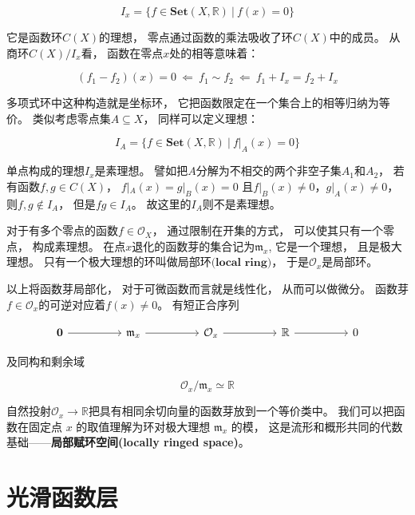 \documentclass[10pt, openany]{book}
\begin{document}
$$
I_x = \{ f \in \textbf{Set}(X,\mathbb R) \ | \ f(x) = 0 \}
$$

它是函数环$C(X)$的理想，
零点通过函数的乘法吸收了环$C(X)$中的成员。
从商环$C(X)/I_x$看，
函数在零点$x$处的相等意味着：

$$
(f_1 - f_2)(x) = 0 \ \Longleftarrow \ f_1 \sim f_2  \ \Longleftarrow \ f_1 + I_x = f_2 + I_x
$$

多项式环中这种构造就是坐标环，
它把函数限定在一个集合上的相等归纳为等价。
类似考虑零点集$A \subseteq X$，
同样可以定义理想：

$$
I_A = \{ f \in \textbf{Set}(X,\mathbb R) \ | \ f|_A(x) = 0 \}
$$

单点构成的理想$I_x$是素理想。
譬如把$A$分解为不相交的两个非空子集$A_1$和$A_2$，
若有函数$f,g\in C(X)$，
$f|_A(x) = g|_B(x) = 0$
且$f|_B(x) \neq 0$，$g|_A(x) \neq 0$，
则$f,g \notin I_A$，
但是$fg \in I_A$。
故这里的$I_A$则不是素理想。

对于有多个零点的函数$f\in \mathcal O_X$，
通过限制在开集的方式，
可以使其只有一个零点，
构成素理想。
在点$x$退化的函数芽的集合记为$\mathfrak m_x$,
它是一个理想，
且是极大理想。
只有一个极大理想的环叫做$\textbf{局部环(local ring)}$，
于是$\mathcal O_x$是局部环。

以上将函数芽局部化，
对于可微函数而言就是线性化，
从而可以做微分。
函数芽$f \in \mathcal O_x$的可逆对应着$f(x) \neq 0$。
有短正合序列

$$
\begin{tikzcd}
\textbf 0 \arrow[rr] &  & \mathfrak m_x \arrow[rr] &  & \mathcal O_x \arrow[rr] &  & \mathbb R \arrow[rr] &  & 0
\end{tikzcd}
$$

及同构和剩余域

$$
\mathcal O_x/\mathfrak m_x \simeq \mathbb R
$$

自然投射$\mathcal O_x \to \mathbb R$把具有相同余切向量的函数芽放到一个等价类中。
我们可以把函数在固定点 $x$ 的取值理解为环对极大理想 $\mathfrak m_x$ 的模，
这是流形和概形共同的代数基础——\textbf{局部赋环空间(locally ringed space)}。


\section{光滑函数层}
\end{document}
